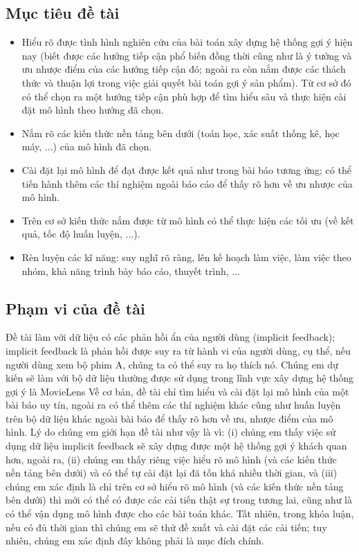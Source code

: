 \documentclass{article}[14pt]
\begin{document}
{      \subsection{Mục tiêu đề tài}
      
  \begin{itemize}
  \item     Hiểu rõ được tình hình nghiên cứu của bài toán xây dựng hệ thống gợi ý
   hiện nay (biết được các hướng tiếp cận phổ biến đồng thời cũng như là ý tưởng 
   và ưu nhược điểm của các hướng tiếp cận đó; ngoài ra còn nắm được các 
   thách thức và thuận lợi trong việc giải quyết bài toán gợi ý sản phẩm). Từ cơ 
   sở đó có thể chọn ra một hướng tiếp cận phù hợp để tìm hiểu sâu và thực hiện 
   cài đặt mô hình theo hướng đã chọn.
  \item      Nắm rõ các kiến thức nền tảng bên dưới (toán học, xác suất thống kê, 
  học máy, ...) của mô hình đã chọn.
  \item     Cài đặt lại mô hình  để đạt được kết quả như trong bài báo tương ứng; 
  có thể tiến hành thêm các thí nghiệm ngoài báo cáo để thấy rõ hơn về ưu nhược 
  của mô hình.
  \item     Trên cơ sở kiến thức nắm được từ mô hình có thể thực hiện các tối ưu 
  (về kết quả, tốc độ huấn luyện, ...).
  \item     Rèn luyện các kĩ năng: suy nghĩ rõ ràng, lên kế hoạch làm việc, 
  làm việc theo nhóm, khả năng trình bày báo cáo, thuyết trình, ...
  \end{itemize}

    
    \subsection{Phạm vi của đề tài}
    
    Đề tài làm với dữ liệu có các phản hồi ẩn của người dùng (implicit feedback);
     implicit feedback là phản hồi được suy ra từ hành vi của người dùng, 
    cụ thể, nếu người dùng xem bộ phim A, chúng ta có thể suy ra họ thích nó. 
    Chúng em dự kiến sẽ làm với bộ dữ liệu thường được sử 
    dụng trong lĩnh vực xây dựng  hệ thống gợi ý là MovieLens
    Về cơ bản, đề tài chỉ tìm hiểu và cài đặt lại mô hình của một bài báo uy 
tín, ngoài ra có thể thêm các thí nghiệm khác cũng như huấn luyện trên 
bộ dữ liệu khác ngoài bài báo để thấy rõ hơn về ưu, nhược điểm của mô 
hình.
    Lý do chúng em giới hạn đề tài như vậy là vì: (i) chúng em thấy việc sử dụng 
    dữ liệu implicit feedback sẽ xây dựng được một hệ thống gợi ý khách quan hơn, 
     ngoài ra, (ii) chúng em thấy riêng 
việc hiểu rõ mô hình (và các kiến thức nền tảng bên dưới) và có thể tự 
cài đặt lại đã tốn khá nhiều thời gian, và (iii) chúng em xác định là chỉ 
trên cơ sở hiểu rõ mô hình (và các kiến thức nền tảng bên dưới) thì mới 
có thể có được các cải tiến thật sự trong tương lai, cũng như là có thể 
vận dụng mô hình được cho các bài toán khác.
    Tất nhiên, trong khóa luận, nếu có đủ thời gian thì chúng em sẽ thử đề 
xuất và cài đặt các cải tiến; tuy nhiên, chúng em xác định đây không 
phải là mục đích chính.
    
}
\end{document}
